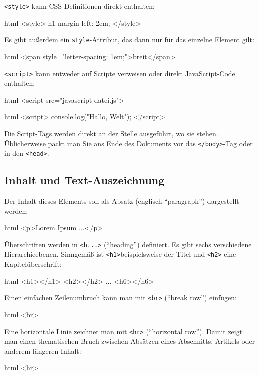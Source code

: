 \documentclass[10pt,a4paper]{article}
\begin{document}
\begin{multicols}{3}
\texttt{<style>} kann CSS-Definitionen direkt enthalten:
\begin{codebox}{html}{}
<style>
h1 {
  margin-left: 2em;
}
</style>
\end{codebox}

Es gibt außerdem ein \texttt{style}-Attribut, das dann nur für das einzelne Element gilt:
\begin{codebox}{html}{}
<span style="letter-spacing: 1em;">breit</span>
\end{codebox}

\texttt{<script>} kann entweder auf Scripte verweisen oder direkt JavaScript-Code enthalten:
\begin{codebox}{html}{}
<script src="javascript-datei.js">
\end{codebox}
\begin{codebox}{html}{}
<script>
console.log("Hallo, Welt");
</script>
\end{codebox}

Die Script-Tags werden direkt an der Stelle ausgeführt, wo sie stehen. Üblicherweise packt man Sie ans Ende des Dokuments vor das \texttt{</body>}-Tag oder in den \texttt{<head>}.


\subsection*{Inhalt und Text-Auszeichnung}

Der Inhalt dieses Elements soll als Absatz (englisch \enquote{paragraph}) dargestellt werden:
\begin{codebox}{html}{}
<p>Lorem Ipsum ...</p>
\end{codebox}

Überschriften werden in \texttt{<h...>} (\enquote{heading}) definiert. Es gibt sechs verschiedene Hierarchie\-ebenen. Sinngemäß ist \texttt{<h1>}beispielsweise der Titel und \texttt{<h2>} eine Kapitelüberschrift:
\begin{codebox}{html}{}
<h1></h1>
<h2></h2>
...
<h6></h6>
\end{codebox}

Einen einfachen Zeilenumbruch kann man mit \texttt{<br>} (\enquote{break row}) einfügen:
\begin{codebox}{html}{}
<br>
\end{codebox}

Eine horizontale Linie zeichnet man mit \texttt{<hr>} (\enquote{horizontal row}). Damit zeigt man einen thematischen Bruch zwischen Absätzen eines Abschnitts, Artikels oder anderem längeren Inhalt:
\begin{codebox}{html}{}
<hr>
\end{codebox}


\end{multicols}
\end{document}
